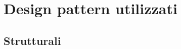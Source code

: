 \documentclass[../PianoDiQualifica.tex]{subfiles}
\begin{document}
	\section{Design pattern utilizzati}
		\subsection{Strutturali}
\end{document}
